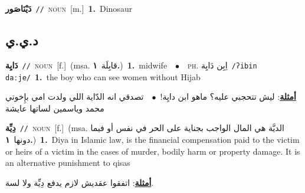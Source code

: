 \documentclass[10pt,a4paper,twoside]{article} %
\begin{document}
\begin{multicols}{2}
{\setlength\topsep{0pt}\textbf{\foreignlanguage{arabic}{دَيْنَاصَور}}\ {\color{gray}\texttt{//}\color{black}}\ \textsc{noun}\ [m.]\ \textbf{1.}~Dinosaur\ } \vspace{2mm}

\vspace{-3mm}
\subsection*{\color{blue}\foreignlanguage{arabic}{د.ي.ي}\color{blue}{}} 

{\setlength\topsep{0pt}\textbf{\foreignlanguage{arabic}{دَايِة}}\ {\color{gray}\texttt{//}\color{black}}\ \textsc{noun}\ [f.]\ \color{gray}(msa. \foreignlanguage{arabic}{قابِلَة}~\foreignlanguage{arabic}{\textbf{١.}})\color{black}\ \textbf{1.}~midwife\ \ $\bullet$\ \ \textsc{ph.} \color{gray} \foreignlanguage{arabic}{اِبِن دَايِة}\color{black}\ {\color{gray}\texttt{/{\sffamily ʔibin daːje}/}\color{black}}\ \textbf{1.}~the boy who can see women without Hijab\  \begin{flushright}\color{gray}\foreignlanguage{arabic}{\textbf{\underline{\foreignlanguage{arabic}{أمثلة}}}: ليش تتحجبي عليه؟ ماهو ابن دايِة!\ $\bullet$\ \  تصدقي انه الدّاية اللي ولدت امي بإِخوتي محمد وياسمين لساتها عايشة}\end{flushright}\color{black}} \vspace{2mm}

{\setlength\topsep{0pt}\textbf{\foreignlanguage{arabic}{دِيِّة}}\ {\color{gray}\texttt{//}\color{black}}\ \textsc{noun}\ [f.]\ \color{gray}(msa. \foreignlanguage{arabic}{الديَّة هي المال الواجب بجناية على الحر في نفس أو فيما دونها}~\foreignlanguage{arabic}{\textbf{١.}})\color{black}\ \textbf{1.}~Diya in Islamic law, is the financial compensation paid to the victim or heirs of a victim in the cases of murder, bodily harm or property damage. It is an alternative punishment to qisas\  \begin{flushright}\color{gray}\foreignlanguage{arabic}{\textbf{\underline{\foreignlanguage{arabic}{أمثلة}}}: اتفقوا عقديش لازم يدفع دِيِّة ولا لسة.}\end{flushright}\color{black}} \vspace{2mm}

\end{multicols}
\end{document}
